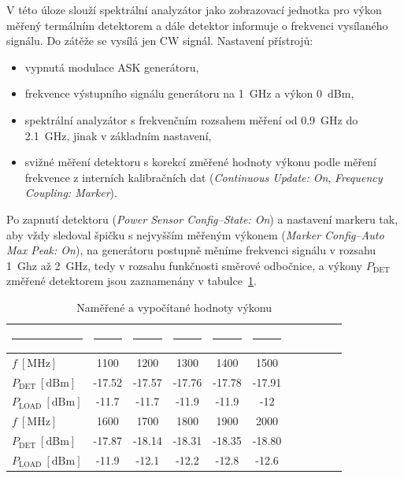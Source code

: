 \documentclass[11pt,a4paper]{article}
\begin{document}
V této úloze slouží spektrální analyzátor jako zobrazovací jednotka pro výkon měřený termálním detektorem a dále detektor informuje o frekvenci vysílaného signálu. Do zátěže se vysílá jen CW signál. Nastavení přístrojů:
\begin{itemize}
    \item vypnutá modulace ASK generátoru,
    \item frekvence výstupního signálu generátoru na 1~GHz a výkon 0~dBm,
    \item spektrální analyzátor s frekvenčním rozsahem měření od 0.9~GHz do 2.1~GHz, jinak v základním nastavení,
    \item svižné měření detektoru s korekcí změřené hodnoty výkonu podle měření frekvence z interních kalibračních dat (\emph{Continuous Update: On}, \emph{Frequency Coupling: Marker}).
\end{itemize}
Po zapnutí detektoru (\emph{Power Sensor Config--State: On}) a nastavení markeru tak, aby vždy sledoval špičku s nejvyšším měřeným výkonem (\emph{Marker Config--Auto Max Peak: On}), na generátoru postupně měníme frekvenci signálu v rozsahu 1~Ghz až 2~GHz, tedy v rozsahu funkčnosti směrové odbočnice, a výkony $P_{\mathrm{DET}}$ změřené detektorem jsou zaznamenány v tabulce~\ref{table:task2-data}.
\begin{table}[!ht]
    \centering
    \begin{tabular}{|l||c|c|c|c|c|c|c|c|c|c|}
        \rule{2cm}{0pt} & \rule{1.5cm}{0pt} & \rule{1.5cm}{0pt} & \rule{1.5cm}{0pt} & \rule{1.5cm}{0pt} & \rule{1.5cm}{0pt}\\[-\arraystretch\normalbaselineskip]
        \hline
        $f\ [\mathrm{MHz}]$ & 1100 & 1200 & 1300 & 1400 & 1500\\
        \hline
        $P_{\mathrm{DET}} \ [\mathrm{dBm}]$ & -17.52 & -17.57 & -17.76 & -17.78 & -17.91\\
        \hline
        $P_{\mathrm{LOAD}} \ [\mathrm{dBm}]$ & -11.7 & -11.7 & -11.9 & -11.9 & -12\\
        \hline\hline
        $f\ [\mathrm{MHz}]$ & 1600 & 1700 & 1800 & 1900 & 2000\\
        \hline
        $P_{\mathrm{DET}} \ [\mathrm{dBm}]$ & -17.87 & -18.14 & -18.31 & -18.35 & -18.80\\
        \hline
        $P_{\mathrm{LOAD}} \ [\mathrm{dBm}]$ & -11.9 & -12.1 & -12.2 & -12.8 & -12.6\\
        \hline
    \end{tabular}
    \caption{\label{table:task2-data}Naměřené a vypočítané hodnoty výkonu}
\end{table}
\end{document}
